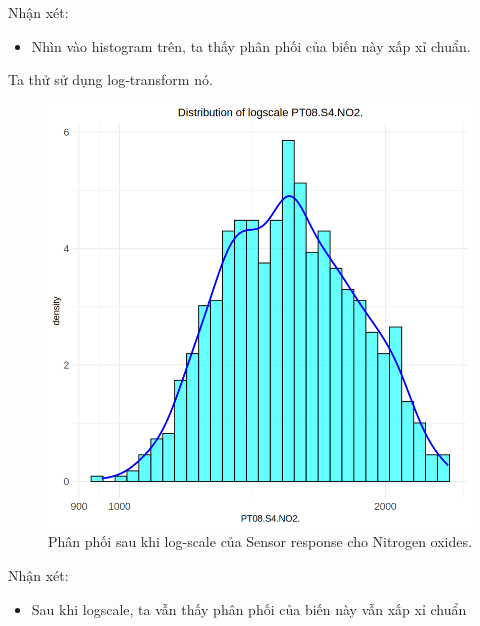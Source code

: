 Nhận xét:
\begin{itemize}
    \item Nhìn vào histogram trên, ta thấy phân phối của biến này xấp xỉ chuẩn.
\end{itemize}

Ta thử sử dụng log-transform nó.

\begin{figure}[H]
    \centering
    \includegraphics[width=0.75\columnwidth]{air_figures/PT08.S4(NO2)_logscale_distribution.png}
    \caption{Phân phối sau khi log-scale của Sensor response cho Nitrogen oxides.}
    \label{fig:ptno2_logscale_distribution}
\end{figure}
Nhận xét:
\begin{itemize}
    \item Sau khi logscale, ta vẫn thấy phân phối của biến này vẫn xấp xỉ chuẩn
\end{itemize}

